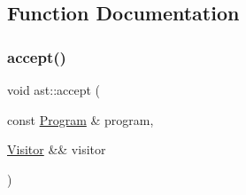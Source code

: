 \subsection{Function Documentation}
\mbox{\label{namespaceast_ae8ec562ad69aa05004765217ff90879b}} 
\subsubsection{\texorpdfstring{accept()}{accept()}}
{\footnotesize\ttfamily void ast\+::accept (\begin{DoxyParamCaption}\item[{const \hyperlink{structast_1_1_program}{Program} \&}]{program,  }\item[{\hyperlink{structast_1_1_visitor}{Visitor} \&\&}]{visitor }\end{DoxyParamCaption})}

